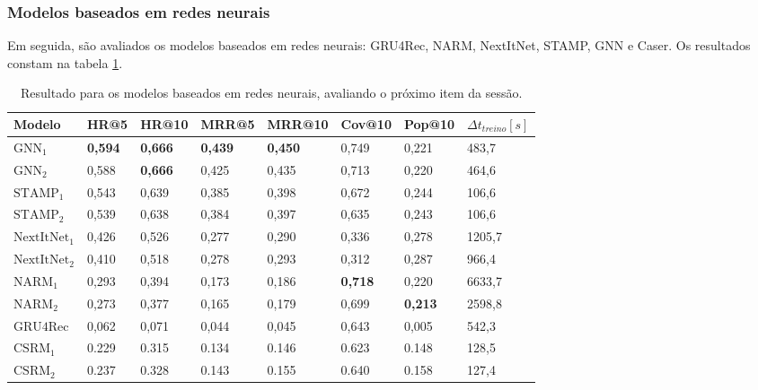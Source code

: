 \subsubsection{Modelos baseados em redes neurais}
Em seguida, são avaliados os modelos baseados em redes neurais: GRU4Rec, NARM,
NextItNet, STAMP, GNN e Caser. Os resultados constam na tabela \ref{tab_nn_next_item}.


\begin{table}[htbp]
  \centering
  \begin{tabular}{|l|l|l|l|l|l|l|l|}
  \hline
  Modelo & HR@5 & HR@10 & MRR@5 & MRR@10 & Cov@10 & Pop@10 & $\Delta t_{treino} [s]$ \\
  \hline
  $\text{GNN}_1$ & \textbf{0,594} & \textbf{0,666} & \textbf{0,439} & \textbf{0,450} & 0,749 & 0,221 & 483,7 \\
  \hline
  $\text{GNN}_2$ & 0,588 & \textbf{0,666} & 0,425 & 0,435 & 0,713 & 0,220 & 464,6 \\
  \hline
  $\text{STAMP}_1$ & 0,543 & 0,639 & 0,385 & 0,398 & 0,672 & 0,244 & 106,6 \\
  \hline
  $\text{STAMP}_2$ & 0,539 & 0,638 & 0,384 & 0,397 & 0,635 & 0,243 & 106,6 \\
  \hline  
  $\text{NextItNet}_1$ & 0,426 & 0,526 & 0,277 & 0,290 & 0,336 & 0,278 & 1205,7 \\
  \hline
  $\text{NextItNet}_2$ & 0,410 & 0,518 & 0,278 & 0,293 & 0,312 & 0,287 & 966,4 \\
  \hline
  $\text{NARM}_1$ & 0,293 & 0,394 & 0,173 & 0,186 & \textbf{0,718} & 0,220 & 6633,7 \\
  \hline
  $\text{NARM}_2$ &  0,273 & 0,377 & 0,165 & 0,179 & 0,699 & \textbf{0,213} & 2598,8 \\
  \hline
  $\text{GRU4Rec}$ & 0,062 & 0,071 & 0,044 & 0,045 & 0,643 & 0,005 & 542,3 \\
  \hline
  $\text{CSRM}_1$ & 0.229 & 0.315 & 0.134 & 0.146 & 0.623 & 0.148 &  128,5 \\
  \hline
  $\text{CSRM}_2$ & 0.237 & 0.328 & 0.143 & 0.155 & 0.640 & 0.158 & 127,4 \\
  \hline
\end{tabular}
  \caption{Resultado para os modelos baseados em redes neurais, avaliando o próximo item da sessão.}
  \label{tab_nn_next_item}
\end{table}

